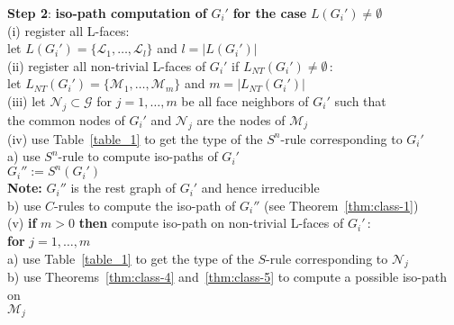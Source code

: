 \documentclass[a4paper,11pt]{article}
\begin{document}
\noindent\mbox{}\hspace{0.3cm}    {\bf Step 2}: {\bf iso-path computation of} $G_i'$
{\bf for the case} $L(G_i')\neq\emptyset$\\
\mbox{}\hspace{0.6cm}      (i) register all L-faces: \\
\mbox{}\hspace{1.2cm}          let $L(G_i')=\{\mathcal{L}_1,\ldots,\mathcal{L}_l\}$ and $l=|L(G_i')|$\\
\mbox{}\hspace{0.6cm}      (ii) register all non-trivial L-faces of $G_i'$ if $L_{NT}(G_i')\neq\emptyset$\,:\\
\mbox{}\hspace{1.2cm}           let $L_{NT}(G_i')=\{\mathcal{M}_1,\ldots,\mathcal{M}_m\}$ and $m=|L_{NT}(G_i')|$\\
\mbox{}\hspace{0.6cm}      (iii) let $\mathcal{N}_j\subset\mathcal{G}$ for $j=1,\ldots,m$ be all face neighbors of $G_i'$ such that \\
\mbox{}\hspace{1.4cm}            the common nodes of $G_i'$ and $\mathcal{N}_j$ are the nodes of $\mathcal{M}_j$\\
\mbox{}\hspace{0.6cm}      (iv) use Table~\ref{table_1} to get the type of the $S^n$-rule corresponding to $G_i'$\\
\mbox{}\hspace{1.3cm}            a) use $S^n$-rule to compute iso-paths of $G_i'$ \\
\mbox{} \hspace{1.7cm}              $G_i'':=S^n(G_i')$\\
\mbox{} \hspace{1.7cm}              {\bf Note: }$G_i''$ is the rest graph of $G_i'$ and hence irreducible\\
\mbox{}\hspace{1.3cm}            b) use $C$-rules to compute the iso-path of $G_i''$ (see Theorem~\ref{thm:class-1})\\
\mbox{}\hspace{0.6cm}     (v) {\bf if} $m>0$ {\bf then} compute iso-path on non-trivial L-faces of $G_i'$\,:\\
\mbox{}\hspace{1.2cm}         {\bf for} $j=1,\ldots,m$\\
\mbox{}\hspace{1.7cm}             a) use Table~\ref{table_1} to get the type of the $S$-rule corresponding to $\mathcal{N}_j$\\
\mbox{}\hspace{1.7cm}             b) use Theorems~\ref{thm:class-4} and~\ref{thm:class-5} to compute a possible iso-path on\\
\mbox{}\hspace{2.27cm}                $\mathcal{M}_j$\\
\end{document}
